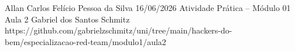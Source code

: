 \documentclass{article}
\begin{document}
{Allan Carlos Felício Pessoa da Silva}
{16/06/2026}
{Atividade Prática -- Módulo 01}
{Aula 2}
{Gabriel dos Santos Schmitz}
{https://github.com/gabrielzschmitz/uni/tree/main/hackers-do-bem/especializacao-red-team/modulo1/aula2}











\newpage
\printbibliography[title=Referências]
\end{document}
